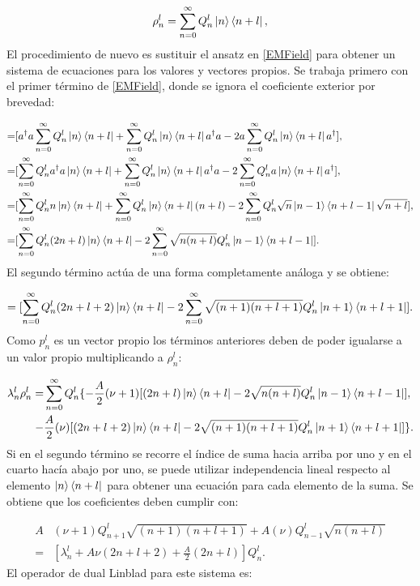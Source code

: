 \documentclass[a4paper,10pt]{report}
\begin{document}
\begin{equation}
 \rho^l_n = \sum_{n=0}^\infty Q_n^l\Ket{n}\Bra{n+l},
\end{equation} El procedimiento de nuevo es sustituir el ansatz en \eqref{EMField} para obtener un sistema de ecuaciones para los valores y vectores propios. Se trabaja primero con el primer término de \eqref{EMField}, donde se ignora el coeficiente exterior por brevedad:

\begin{align*}
=&[a^\dagger a\sum_{n=0}^\infty Q_n^l\Ket{n}\Bra{n+l} + \sum_{n=0}^\infty Q_n^l\Ket{n}\Bra{n+l} a^\dagger a -2a\sum_{n=0}^\infty Q_n^l\Ket{n}\Bra{n+l} a^\dagger],\\
=&[\sum_{n=0}^\infty Q_n^la^\dagger a\Ket{n}\Bra{n+l} + \sum_{n=0}^\infty Q_n^l\Ket{n}\Bra{n+l} a^\dagger a -2\sum_{n=0}^\infty Q_n^la\Ket{n}\Bra{n+l} a^\dagger],\\
=&[\sum_{n=0}^\infty Q_n^ln\Ket{n}\Bra{n+l} + \sum_{n=0}^\infty Q_n^l\Ket{n}\Bra{n+l} (n+l) -2\sum_{n=0}^\infty Q_n^l\sqrt{n}\Ket{n-1}\Bra{n+l-1}\sqrt{n+l}],\\
=&[\sum_{n=0}^\infty Q_n^l(2n+l)\Ket{n}\Bra{n+l} -2\sum_{n=0}^\infty\sqrt{n(n+l)} Q_n^l\Ket{n-1}\Bra{n+l-1}].\\
\end{align*} El segundo término actúa de una forma completamente análoga y se obtiene:

\begin{equation}
=[\sum_{n=0}^\infty Q_n^l(2n+l+2)\Ket{n}\Bra{n+l} -2\sum_{n=0}^\infty\sqrt{(n+1)(n+l+1)} Q_n^l\Ket{n+1}\Bra{n+l+1}].
\end{equation} Como $p^l_n$  es un vector propio los términos anteriores deben de poder igualarse a un valor propio multiplicando a $\rho^l_n$:

\begin{align}
\lambda_n^l \rho_n^l=& \sum_{n=0}^\infty Q_n^l \{ -\frac{A}{2}(\nu+1)[(2n+l)\Ket{n}\Bra{n+l} -2\sqrt{n(n+l)} Q_n^l\Ket{n-1}\Bra{n+l-1}] \nonumber, \\
-&\frac{A}{2}(\nu)[(2n+l+2)\Ket{n}\Bra{n+l}-2\sqrt{(n+1)(n+l+1)} Q_n^l\Ket{n+1}\Bra{n+l+1}]\}.
\end{align} Si en el segundo término se recorre el índice de suma hacia arriba por uno y en el cuarto hacía abajo por uno, se puede utilizar independencia lineal respecto al elemento $\Ket{n}\Bra{n+l}$ para obtener una ecuación para cada elemento de la suma. Se obtiene que los coeficientes deben cumplir con:

\begin{align}\label{RecurrenciaStengholm}
A&(\nu+1) Q_{n+1}^l \sqrt{(n+1)(n+l+1) }+ A(\nu) Q_{n-1}^l\sqrt{n(n+l)}\\ \nonumber
=&[\lambda_n^l+A\nu(2n+l+2)+\frac{A}{2}(2n+l)]Q_{n}^l.
\end{align} El operador de dual Linblad para este sistema es:
\end{document}
